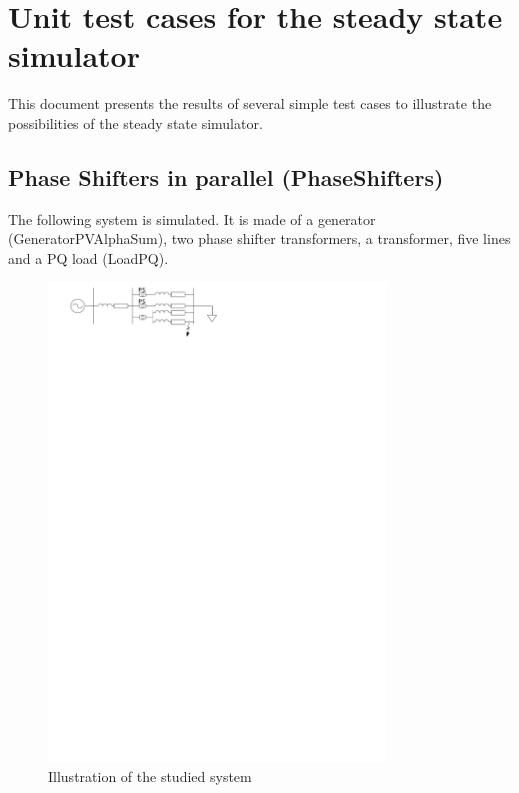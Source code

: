 \documentclass[a4paper, 12pt]{report}
\begin{document}
\chapter*{Unit test cases for the steady state simulator}

This document presents the results of several simple test cases to illustrate the possibilities of the steady state simulator.

\section*{Phase Shifters in parallel (PhaseShifters)}

The following system is simulated. It is made of a generator (GeneratorPVAlphaSum), two phase shifter transformers, a transformer, five lines and a PQ load (LoadPQ).\\

\begin{figure}[H]
  \begin{center}
  \includegraphics[width=0.8\textwidth]{PhaseShifters/PhaseShifters}
  \end{center}
  \caption{Illustration of the studied system}
\end{figure}
\end{document}
